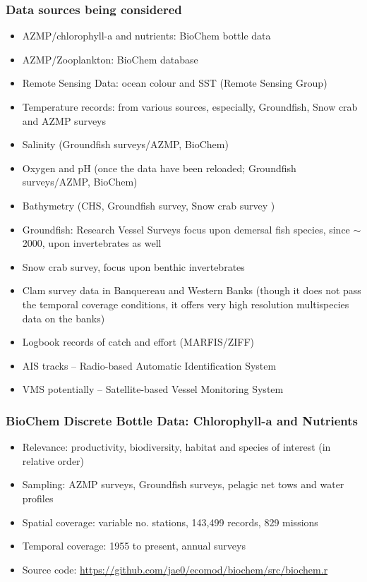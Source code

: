 \documentclass{beamer}
\numberwithin{equation}{section}		%
\numberwithin{figure}{section}		%
\numberwithin{table}{section}				%
\begin{document}
\begin{frame}[shrink]
  \frametitle{Data sources being considered}
\begin{itemize}
	\item AZMP/chlorophyll-a and nutrients: BioChem bottle data 
  \item AZMP/Zooplankton: BioChem database 
  \item Remote Sensing Data: ocean colour and SST (Remote Sensing Group)
  \item Temperature records: from various sources, especially, Groundfish, Snow crab and AZMP surveys
  \item Salinity (Groundfish surveys/AZMP, BioChem)
  \item Oxygen and pH (once the data have been reloaded; Groundfish surveys/AZMP, BioChem)
  \item Bathymetry (CHS, Groundfish survey, Snow crab survey )
  \item Groundfish: Research Vessel Surveys focus upon demersal fish species, since $\sim$ 2000, upon invertebrates as well
  \item Snow crab survey, focus upon benthic invertebrates
  \item Clam survey data in Banquereau and Western Banks (though it does not pass the temporal coverage conditions, it offers very high resolution multispecies data on the banks)
  \item Logbook records of catch and effort (MARFIS/ZIFF)
  \item AIS tracks -- Radio-based Automatic Identification System
  \item VMS potentially -- Satellite-based Vessel Monitoring System
\end{itemize}
    
\end{frame}



\begin{frame}
  \frametitle{BioChem Discrete Bottle Data: Chlorophyll-a and Nutrients}
\begin{itemize}
  \item Relevance: productivity, biodiversity, habitat and species of interest (in relative order)
  \item Sampling: AZMP surveys, Groundfish surveys, pelagic net tows and water profiles
  \item Spatial coverage: variable no. stations, 143,499 records, 829 missions
  \item Temporal coverage: 1955 to present, annual surveys
  \item Source code: \url{https://github.com/jae0/ecomod/biochem/src/biochem.r}
\end{itemize}
\end{frame}
\end{document}
